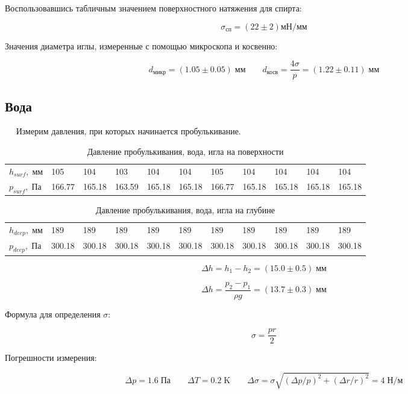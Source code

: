 \documentclass[12pt,a4paper]{article}
\begin{document}
		Воспользовавшись табличным значением поверхностного натяжения для спирта:
		
		$$\sigma_{\text{сп}} = (22 \pm 2) \text{мН} / \text{мм}$$
		
		Значения диаметра иглы, измеренные с помощью микроскопа и косвенно:
		
		$$ d_{\text{микр}} = (1.05 \pm 0.05) \; \text{мм} \qquad d_{\text{косв}} = \frac{4\sigma}{p} =  (1.22 \pm 0.11) \; \text{мм} $$
		
	\subsection*{Вода}
	
		$\quad$ Измерим давления, при которых начинается пробулькивание.
		
		\begin{table}[H]
			\caption{Давление пробулькивания, вода, игла на поверхности}
			\begin{tabular}{|l|llllllllll|}
				$h_{surf}, \; \text{мм}$ & 105    & 104    & 103    & 104    & 104    & 105    & 104    & 104    & 104    & 104    \\
				$p_{surf}, \; \text{Па}$ & 166.77 & 165.18 & 163.59 & 165.18 & 165.18 & 166.77 & 165.18 & 165.18 & 165.18 & 165.18
			\end{tabular}
		\end{table}
		
		\begin{table}[H]
			\caption{Давление пробулькивания, вода, игла на глубине}
			\begin{tabular}{|l|llllllllll|}
				$h_{deep}, \; \text{мм}$ & 189    & 189    & 189    & 189    & 189    & 189    & 189    & 189    & 189    & 189    \\
				$p_{deep}, \; \text{Па}$ & 300.18 & 300.18 & 300.18 & 300.18 & 300.18 & 300.18 & 300.18 & 300.18 & 300.18 & 300.18
			\end{tabular}
		\end{table}
	
		$$\Delta h = h_1 - h_2 = (15.0 \pm 0.5) \; \text{мм}$$
		
		$$\Delta h = \frac{p_2 - p_1}{\rho g} = (13.7 \pm 0.3) \; \text{мм}$$
	
		Формула для определения $\sigma$:
		
		$$ \sigma = \frac{pr}{2}$$
		
		Погрешности измерения:
		
		$$\varDelta p = 1.6 \; \text{Па} \qquad \varDelta T = 0.2 \; \text{K} \qquad \varDelta \sigma = \sigma \sqrt{ (\varDelta p / p)^2 + (\varDelta r / r)^2 } = 4 \; \text{Н} / \text{м}$$
\end{document}
